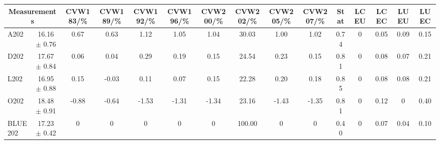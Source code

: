 \begin{table}[H]
\scriptsize
\begin{center}
\renewcommand{\arraystretch}{1.1}
\begin{tabular}{|lc|c|c|c|c|c|c|c|c|ccccc|}
\hline
\multicolumn{2}{|c|}{Measurements} & CVW{\tiny 183}/\%  & CVW{\tiny 189}/\%  & CVW{\tiny 192}/\%  & CVW{\tiny 196}/\%  & CVW{\tiny 200}/\%  & CVW{\tiny 202}/\%  & CVW{\tiny 205}/\%  & CVW{\tiny 207}/\%  & {\tiny Stat} & {\tiny LCEU} & {\tiny LCEC} & {\tiny LUEU} & {\tiny LUEC}\\
\hline
A202 &      16.16 $\pm$       0.76 &       0.67 &       0.63 &       1.12 &       1.05 &       1.04 &      30.03 &       1.00 &       1.02 &       0.74 &  0 &       0.05 &       0.09 &       0.15\\
D202 &      17.67 $\pm$       0.84 &       0.06 &       0.04 &       0.29 &       0.19 &       0.15 &      24.54 &       0.23 &       0.15 &       0.81 &  0 &       0.08 &       0.07 &       0.21\\
L202 &      16.95 $\pm$       0.88 &       0.15 &      -0.03 &       0.11 &       0.07 &       0.15 &      22.28 &       0.20 &       0.18 &       0.85 &  0 &       0.08 &       0.08 &       0.21\\
O202 &      18.48 $\pm$       0.91 &      -0.88 &      -0.64 &      -1.53 &      -1.31 &      -1.34 &      23.16 &      -1.43 &      -1.35 &       0.81 &  0 &       0.12 &  0 &       0.40\\
\hline
BLUE {\tiny 202} &      17.23 $\pm$       0.42 &  0 &  0 &  0 &  0 &  0 &     100.00 &  0 &  0 &       0.40 &  0 &       0.07 &       0.04 &       0.10\\
\hline
\end{tabular}
\renewcommand{\arraystretch}{1}
\end{center}
\end{table}
\vspace*{-0.5cm}
